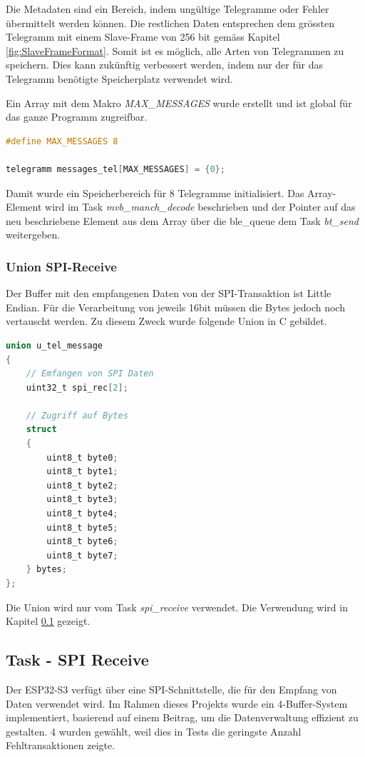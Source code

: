 Die Metadaten sind ein Bereich, indem ungültige Telegramme oder Fehler übermittelt werden können. Die restlichen Daten entsprechen dem grössten Telegramm mit einem Slave-Frame von 256 bit gemäss Kapitel \ref{fig:SlaveFrameFormat}. Somit ist es möglich, alle Arten von Telegrammen zu speichern. Dies kann zukünftig verbessert werden, indem nur der für das Telegramm benötigte Speicherplatz verwendet wird. 

Ein Array mit dem Makro \textit{MAX\_MESSAGES} wurde erstellt und ist global für das ganze Programm zugreifbar. 

\begin{lstlisting}[language=C]
#define MAX_MESSAGES 8

telegramm messages_tel[MAX_MESSAGES] = {0};
\end{lstlisting}

Damit wurde ein Speicherbereich für 8 Telegramme initialisiert. Das Array-Element wird im Task \textit{mvb\_manch\_decode} beschrieben und der Pointer auf das neu beschriebene Element aus dem Array über die ble\_queue dem Task \textit{bt\_send} weitergeben. 


\subsubsection{Union SPI-Receive}
\label{subsub:UnionSPI}

Der Buffer mit den empfangenen Daten von der SPI-Transaktion ist Little Endian. Für die Verarbeitung von jeweils 16bit müssen die Bytes jedoch noch vertauscht werden. Zu diesem Zweck wurde folgende Union in C gebildet.

\begin{lstlisting}[language=C]
union u_tel_message
{
    // Emfangen von SPI Daten
    uint32_t spi_rec[2];

    // Zugriff auf Bytes
    struct 
    {
        uint8_t byte0;
        uint8_t byte1;
        uint8_t byte2;
        uint8_t byte3;
        uint8_t byte4;
        uint8_t byte5;
        uint8_t byte6;
        uint8_t byte7;
    } bytes;
};
\end{lstlisting}

Die Union wird nur vom Task \textit{spi\_receive} verwendet. Die Verwendung wird in Kapitel \ref{sub:TaskSPIReceive} gezeigt. 


\subsection{Task - SPI Receive}
\label{sub:TaskSPIReceive}
Der ESP32-S3 verfügt über eine SPI-Schnittstelle, die für den Empfang von Daten verwendet wird. Im Rahmen dieses Projekts wurde ein 4-Buffer-System implementiert, basierend auf einem Beitrag\cite{ESP_FORUM_SPI_BUFFER}, um die Datenverwaltung effizient zu gestalten. 4 wurden gewählt, weil dies in Tests die geringste Anzahl Fehltransaktionen zeigte.


